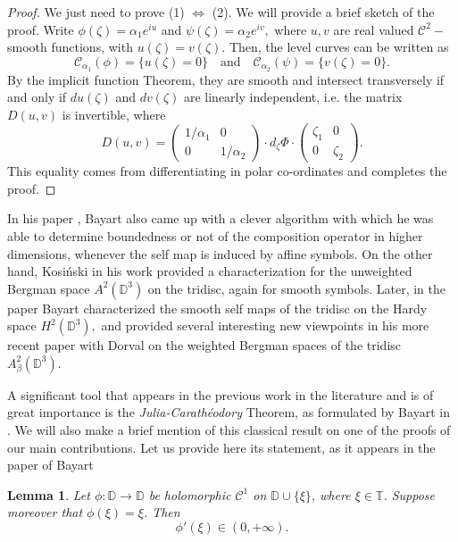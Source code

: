 \documentclass[12pt]{amsart}
\newtheorem{lemma}[theorem]{Lemma}
\numberwithin{equation}{section}
\begin{document}
\begin{proof} We just need to prove (1) $\iff$ (2). We will provide a brief sketch of the proof. Write $\phi(\zeta)=\alpha_1 e^{iu}$ and $\psi(\zeta)=\alpha_2 e^{iv},$ where $u,v$ are real valued $\mathcal{C}^2-$smooth functions, with $u(\zeta)=v(\zeta).$ Then, the level curves can be written as
$$\mathcal{C}_{\alpha_1}(\phi)=\{u(\zeta)=0\} \quad \mathrm{and} \quad \mathcal{C}_{\alpha_2}(\psi)=\{v(\zeta)=0\}.$$
By the implicit function Theorem, they are smooth and intersect transversely if and only if $du(\zeta)$ and $dv(\zeta)$ are linearly independent, i.e. the matrix $D(u,v)$ is invertible, where 
$$D(u,v)=\begin{pmatrix}
1/\alpha_1& 0 \\
 0& 1/\alpha_2  
\end{pmatrix}\cdot
d_\zeta\Phi\cdot\begin{pmatrix}
 \zeta_1&0  \\
 0&\zeta_2  
\end{pmatrix}.$$
This equality comes from differentiating in polar co-ordinates and completes the proof.
\end{proof}

In his paper \cite{Bayart1}, Bayart also came up with a clever algorithm with which he was able to determine boundedness or not of the composition operator in higher dimensions, whenever the self map is induced by affine symbols. On the other hand, Kosi\'nski in his work provided a characterization for the unweighted Bergman space $A^2(\mathbb{D}^3)$ on the tridisc, again for smooth symbols. Later, in the paper \cite{Bayart2} Bayart characterized the smooth self maps of the tridisc on the Hardy space $H^2(\mathbb{D}^3),$ and provided several interesting new viewpoints in his more recent paper with Dorval \cite{Bayart3} on the weighted Bergman spaces of the tridisc $A^2_{\beta}(\mathbb{D}^3).$ 

A significant tool that appears in the previous work in the literature and is of great importance is the \textit{Julia-Carath\'eodory} Theorem, as formulated by Bayart in \cite{Bayart1}. We will also make a brief mention of this classical result on one of the proofs of our main contributions. Let us provide here its statement, as it appears in the paper of Bayart \cite{Bayart1}

\begin{lemma}
Let $\phi:\mathbb{D}\to\mathbb{D}$ be holomorphic $\mathcal{C}^{1}$ on $\mathbb{D} \cup \{\xi\}$, where $\xi \in \mathbb{T}$. Suppose moreover that $\phi(\xi)=\xi$. Then
$$\phi'(\xi)\in (0,+\infty).$$
\end{lemma}
\end{document}
